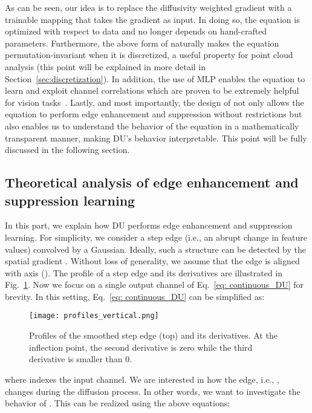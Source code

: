 \documentclass[a4paper,fleqn]{cas-dc}
\begin{document}
As can be seen, our idea is to replace the diffusivity weighted gradient with a trainable mapping that takes the gradient as input. In doing so, the equation is optimized with respect to data and no longer depends on hand-crafted parameters. Furthermore, the above form of  naturally makes the equation permutation-invariant when it is discretized, a useful property for point cloud analysis (this point will be explained in more detail in Section~\ref{sec:discretization}). In addition, the use of MLP enables the equation to learn and exploit channel correlations which are proven to be extremely helpful for vision tasks~\cite{hu2018squeeze}. Lastly, and most importantly, the design of  not only allows the equation to perform edge enhancement and suppression without restrictions but also enables us to understand the behavior of the equation in a mathematically transparent manner, making DU's behavior interpretable. This point will be fully discussed in the following section.         









\subsection{Theoretical analysis of edge enhancement and suppression learning}
\label{sec: theoretical_analysis}
In this part, we explain how DU performs edge enhancement and suppression learning.
For simplicity, we consider a step edge (i.e., an abrupt change in feature values) convolved by a Gaussian. Ideally, such a structure can be detected by the spatial gradient . Without loss of generality, we assume that the edge is aligned with  axis (). The profile of a step edge and its derivatives are illustrated in Fig.~\ref{fig: edge_profile}. Now we focus on a single output channel  of Eq.~\eqref{eq: continuous_DU} for brevity. In this setting, Eq.~\eqref{eq: continuous_DU} can be simplified as:

\begin{figure}[t]
    \centering
    \texttt{[image: profiles\_vertical.png]}
    \caption{Profiles of the smoothed step edge (top) and its derivatives. At the inflection point, the second derivative is zero while the third derivative is smaller than 0.
}
    \label{fig: edge_profile}
\end{figure}
where  indexes the input channel. We are interested in how the edge, i.e., , changes during the diffusion process. In other words, we want to investigate the behavior of . This can be realized using the above equations: 
\end{document}
